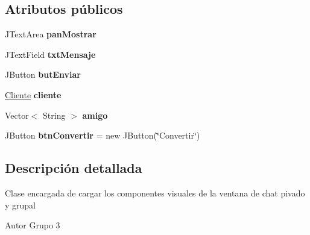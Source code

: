 \subsection*{Atributos públicos}
\begin{DoxyCompactItemize}
\item 
\hypertarget{classcom_1_1ucab_1_1javachat_1_1_cliente_1_1view_1_1_vent_privada_a662e79a310b85a9d2992e940a170df3b}{J\-Text\-Area {\bfseries pan\-Mostrar}}\label{classcom_1_1ucab_1_1javachat_1_1_cliente_1_1view_1_1_vent_privada_a662e79a310b85a9d2992e940a170df3b}

\item 
\hypertarget{classcom_1_1ucab_1_1javachat_1_1_cliente_1_1view_1_1_vent_privada_a426509b196af3b4ace6862ccc7fc36c7}{J\-Text\-Field {\bfseries txt\-Mensaje}}\label{classcom_1_1ucab_1_1javachat_1_1_cliente_1_1view_1_1_vent_privada_a426509b196af3b4ace6862ccc7fc36c7}

\item 
\hypertarget{classcom_1_1ucab_1_1javachat_1_1_cliente_1_1view_1_1_vent_privada_af816b1ead45d840539150f38f6817c05}{J\-Button {\bfseries but\-Enviar}}\label{classcom_1_1ucab_1_1javachat_1_1_cliente_1_1view_1_1_vent_privada_af816b1ead45d840539150f38f6817c05}

\item 
\hypertarget{classcom_1_1ucab_1_1javachat_1_1_cliente_1_1view_1_1_vent_privada_aa8819d3a727764f7d06a273e8a4719dd}{\hyperlink{classcom_1_1ucab_1_1javachat_1_1_cliente_1_1model_1_1_cliente}{Cliente} {\bfseries cliente}}\label{classcom_1_1ucab_1_1javachat_1_1_cliente_1_1view_1_1_vent_privada_aa8819d3a727764f7d06a273e8a4719dd}

\item 
\hypertarget{classcom_1_1ucab_1_1javachat_1_1_cliente_1_1view_1_1_vent_privada_a32830990861e4c6f4810828afd5eb250}{Vector$<$ String $>$ {\bfseries amigo}}\label{classcom_1_1ucab_1_1javachat_1_1_cliente_1_1view_1_1_vent_privada_a32830990861e4c6f4810828afd5eb250}

\item 
\hypertarget{classcom_1_1ucab_1_1javachat_1_1_cliente_1_1view_1_1_vent_privada_a23208b69a72c135e6d1cb0b18dcf7b80}{J\-Button {\bfseries btn\-Convertir} = new J\-Button(\char`\"{}Convertir\char`\"{})}\label{classcom_1_1ucab_1_1javachat_1_1_cliente_1_1view_1_1_vent_privada_a23208b69a72c135e6d1cb0b18dcf7b80}

\end{DoxyCompactItemize}


\subsection{Descripción detallada}
Clase encargada de cargar los componentes visuales de la ventana de chat pivado y grupal \begin{DoxyAuthor}{Autor}
Grupo 3 
\end{DoxyAuthor}


